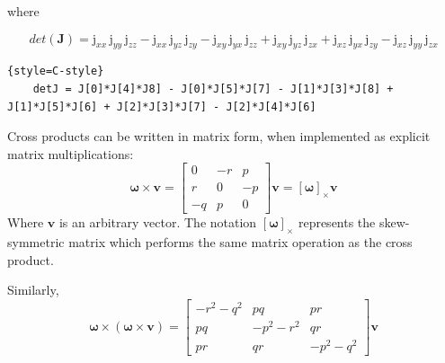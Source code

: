 where

\begin{equation}
	det(\bm{J}) = \mathrm{j}_{xx}\, \mathrm{j}_{yy}\, \mathrm{j}_{zz} - \mathrm{j}_{xx}\, \mathrm{j}_{yz}\, \mathrm{j}_{zy} - \mathrm{j}_{xy}\, \mathrm{j}_{yx}\, \mathrm{j}_{zz} + \mathrm{j}_{xy}\, \mathrm{j}_{yz}\, \mathrm{j}_{zx} + \mathrm{j}_{xz}\, \mathrm{j}_{yx}\, \mathrm{j}_{zy} - \mathrm{j}_{xz}\, \mathrm{j}_{yy}\, \mathrm{j}_{zx}	
\end{equation}
\begin{lstlisting}{style=C-style}
	detJ = J[0]*J[4]*J8] - J[0]*J[5]*J[7] - J[1]*J[3]*J[8] + J[1]*J[5]*J[6] + J[2]*J[3]*J[7] - J[2]*J[4]*J[6]
\end{lstlisting}

Cross products can be written in matrix form, when implemented as explicit matrix multiplications:
\begin{equation}
\bm{\omega}\times \bm{v} = \begin{bmatrix}
0  & -r & p  \\
r  & 0  & -p \\
-q & p  & 0
\end{bmatrix} \bm{v} =  [\bm{\omega}]_\times \bm{v} \label{eq:matrix_cross}
\end{equation}
%
Where $\bm{v}$ is an arbitrary vector. The notation $[\bm{\omega}]_\times$ represents the skew-symmetric matrix which performs the same matrix operation as the cross product.

Similarly,
\begin{equation}
%
\bm{\omega} \times (\bm{\omega} \times \bm{v}) = \begin{bmatrix}
-r^2-q^2 & pq & pr \\
pq & -p^2 -r^2 & qr\\
pr & qr & -p^2-q^2
\end{bmatrix} \bm{v}
\end{equation}

